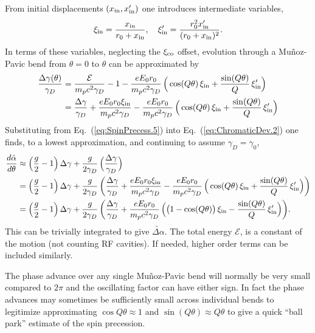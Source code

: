 \documentclass[]{article}
\begin{document}
From initial 
displacements $(x_{\rm in},x'_{\rm in})$ one introduces intermediate variables,
%
\begin{equation}
\xi_{\rm in} = \frac{x_{\rm in}}{r_0+x_{\rm in}},
\quad
\xi_{\rm in}' = \frac{r^2_0x_{\rm in}'}{(r_0+x_{\rm in})^2}.
\label{eq:SpinPrecess.5}
\end{equation}
%
In terms of these variables, neglecting the $\xi_{\rm co}$ offset,
evolution through a Mu\~noz-Pavic bend from $\theta=0$ 
to $\theta$ can be approximated by
%
\begin{align}
\frac{\Delta\gamma(\theta)}{\gamma_D}
 &=
\frac{\mathcal{E}}{m_pc^2\gamma_D}
 -1
 - \frac{eE_0r_0}{m_pc^2\gamma_D}\,
\Big(
\cos(Q\theta)\,\xi_{\rm in}
 + 
\frac{\sin(Q\theta)}{Q}\,\xi'_{\rm in}
\Big)                         \notag\\
 &=
\frac{\Delta\gamma}{\gamma_D}
 +
\frac{eE_0r_0\xi_{\rm in}}{m_pc^2\gamma_D}
 - \frac{eE_0r_0}{m_pc^2\gamma_D}\,
\Big(
\cos(Q\theta)\,\xi_{\rm in}
 + 
\frac{\sin(Q\theta)}{Q}\,\xi'_{\rm in}
\Big) 
\label{eq:SpinPrecess.6}
\end{align}
%
Substituting from Eq.~(\ref{eq:SpinPrecess.5}) 
into Eq.~(\ref{eq:ChromaticDev.2}) one finds,
to a lowest approximation, 
and continuing to assume $\gamma_D=\gamma_0$,
%
\begin{align}
\frac{d\tilde\alpha}{d\theta}
 &\approx
\Big(\frac{g}{2}-1\Big)\,\Delta\gamma
 +
\frac{g}{2\gamma_D}\,
\Big(
\frac{\Delta\gamma}{\gamma_D}
\Big)              \notag \\
 &=
\Big(\frac{g}{2}-1\Big)\,\Delta\gamma
 +
\frac{g}{2\gamma_D}\,
\bigg(
\frac{\Delta\gamma}{\gamma_D}
 +
\frac{eE_0r_0\xi_{\rm in}}{m_pc^2\gamma_D}
 - \frac{eE_0r_0}{m_pc^2\gamma_D}\,
\Big(
\cos(Q\theta)\,\xi_{\rm in}
 + 
\frac{\sin(Q\theta)}{Q}\,\xi'_{\rm in}
\Big)
\bigg)  \notag \\
 &=
\Big(\frac{g}{2}-1\Big)\,\Delta\gamma
 +
\frac{g}{2\gamma_D}\,
\bigg(
\frac{\Delta\gamma}{\gamma_D}
+ \frac{eE_0r_0}{m_pc^2\gamma_D}\,
\Big(
\big(1-\cos(Q\theta)\big)\,\xi_{\rm in}
 - 
\frac{\sin(Q\theta)}{Q}\,\xi'_{\rm in}
\Big)
\bigg).         
\label{eq:SpinPrecess.7}
\end{align}
%
This can be trivially integrated to give $\widetilde{\Delta\alpha}$. 
The total energy $\mathcal{E}$,
is a constant of the motion (not counting RF cavities).
If needed, higher order terms can be included
similarly.

The phase advance over any single Mu\~noz-Pavic bend will
normally be very small compared to $2\pi$ and the
oscillating factor can have either sign. In fact the phase
advances may sometimes be sufficiently small across individual
bends to legitimize approximating $\cos Q\theta\approx1$ and 
$\sin(Q\theta)\approx Q\theta$ to give a quick ``ball park''
estimate of the spin precession.  
\end{document}

